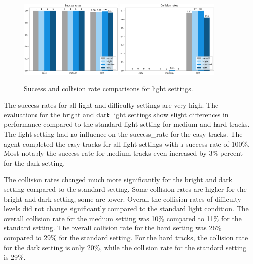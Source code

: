 \begin{figure}
    \centering
    \includegraphics[width=0.45\textwidth]{Bilder/notebook_images/hardDistanceMixedLight_eval_all_success_rates_barplot.png}
    \includegraphics[width=0.45\textwidth]{Bilder/notebook_images/hardDistanceMixedLight_eval_all_collision_rates_barplot.png}
    \caption{Success and collision rate comparisons for light settings.}
    \label{fig:result_success_rates_lightSettings}
\end{figure}

The success rates for all light and difficulty settings are very high. The evaluations for the bright and dark light settings show slight differences in performance compared to the standard light setting for medium and hard tracks. The light setting had no influence on the success\_rate for the easy tracks. The agent completed the easy tracks for all light settings with a success rate of 100\%.
Most notably the success rate for medium tracks even increased by 3\% percent for the dark setting. 

The collision rates changed much more significantly for the bright and dark setting compared to the standard setting. Some collision rates are higher for the bright and dark setting, some are lower. Overall the collision rates of difficulty levels did not change significantly compared to the standard light condition. The overall collision rate for the medium setting was 10\% compared to 11\% for the standard setting. The overall collision rate for the hard setting was 26\% compared to 29\% for the standard setting.
For the hard tracks, the collision rate for the dark setting is only 20\%, while the collision rate for the standard setting is 29\%. 

